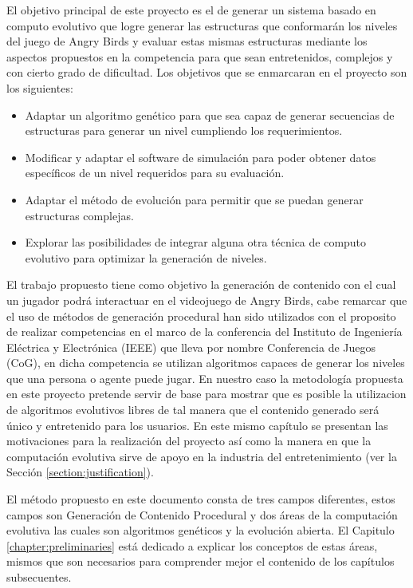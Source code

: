 El objetivo principal de este proyecto es el de generar un sistema basado en
computo evolutivo que logre generar las estructuras que conformarán los niveles
del juego de Angry Birds y evaluar estas mismas estructuras mediante los
aspectos propuestos en la competencia para que sean entretenidos, complejos y con 
cierto grado de dificultad.  Los objetivos que se enmarcaran en el proyecto son los siguientes: 

\begin{itemize}
  \item Adaptar un algoritmo genético para que sea capaz de generar secuencias
  de estructuras para generar un nivel cumpliendo los requerimientos.
  \item Modificar y adaptar el software de simulación para poder obtener datos
  específicos de un nivel requeridos para su evaluación.
  \item Adaptar el método de evolución para permitir que se puedan generar
  estructuras complejas.
  \item Explorar las posibilidades de integrar alguna otra técnica de computo
  evolutivo para optimizar la generación de niveles.
\end{itemize} 

El trabajo propuesto tiene como objetivo la generación
de contenido con el cual un jugador podrá interactuar en el videojuego de
Angry Birds, cabe remarcar que el uso de métodos de generación procedural han
sido utilizados con el proposito de realizar competencias en el marco de la
conferencia del Instituto de Ingeniería Eléctrica y Electrónica (IEEE) que lleva
por nombre Conferencia de Juegos (CoG), en dicha competencia se utilizan
algoritmos capaces de generar los niveles que una persona o agente puede jugar.
En nuestro caso la metodología propuesta en este proyecto pretende servir de
base para mostrar que es posible la utilizacion de algoritmos evolutivos libres
de tal manera que el contenido generado será único y entretenido para los
usuarios. En este mismo capítulo se presentan las motivaciones para la
realización del proyecto así como la manera en que la computación evolutiva
sirve de apoyo en la industria del entretenimiento (ver la Sección
\ref{section:justification}).

El método propuesto en este documento consta de tres campos diferentes, estos
campos son Generación de Contenido Procedural y dos áreas de la computación
evolutiva las cuales son algoritmos genéticos y la evolución abierta. El
Capitulo \ref{chapter:preliminaries} está dedicado a explicar los conceptos
de estas áreas, mismos que son necesarios para comprender mejor el contenido de
los capítulos subsecuentes.

